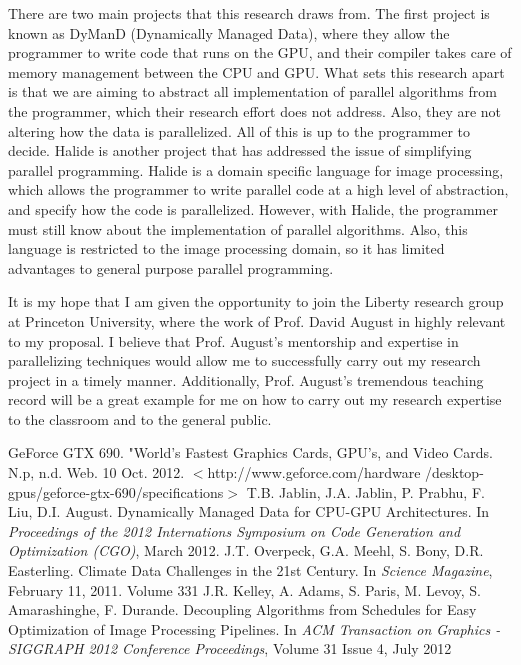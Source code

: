 \documentclass[a4paper,12pt]{article}
\begin{document}
There are two main projects that this research draws from. The first project is known as DyManD (Dynamically Managed Data)\cite{dymand}, where they allow the programmer to write code that runs on the GPU, and their compiler takes care of memory management between the CPU and GPU.  What sets this research apart is that we are aiming to abstract all implementation of parallel algorithms from the programmer, which their research effort does not address. Also, they are not altering how the data is parallelized.  All of this is up to the programmer to decide. Halide\cite{halide} is another project that has addressed the issue of simplifying parallel programming.  Halide is a domain specific language for image processing, which allows the programmer to write parallel code at a high level of abstraction, and specify how the code is parallelized.  However, with Halide, the programmer must still know about the implementation of parallel algorithms.  Also, this language is restricted to the image processing domain, so it has limited advantages to general purpose parallel programming.

It is my hope that I am given the opportunity to join the Liberty research group at Princeton University, where the work of Prof. David August in highly relevant to my proposal. I believe that Prof. August's mentorship and expertise in parallelizing techniques would allow me to successfully carry out my research project in a timely manner. Additionally, Prof. August's tremendous teaching record will be a great example for me on how to carry out my research expertise to the classroom and to the general public. 



\vspace{-2ex}
\begin{thebibliography}{9}
\vspace{-2ex}
 GeForce GTX 690. "World's Fastest Graphics Cards, GPU's, and Video Cards. N.p, n.d. Web. 10 Oct. 2012.
 $<$http://www.geforce.com/hardware /desktop-gpus/geforce-gtx-690/specifications$>$
\vspace{-2ex}
 T.B. Jablin, J.A. Jablin, P. Prabhu, F. Liu, D.I. August. Dynamically Managed Data for CPU-GPU Architectures. In \textit{Proceedings of the 2012 Internations Symposium on Code Generation and Optimization (CGO)}, March 2012.
\vspace{-2ex}
 J.T. Overpeck, G.A. Meehl, S. Bony, D.R. Easterling.  Climate Data Challenges in the 21st Century.  In \textit{Science Magazine}, February 11, 2011.  Volume 331
\vspace{-2ex}
 J.R. Kelley, A. Adams, S. Paris, M. Levoy, S. Amarashinghe, F. Durande.  Decoupling Algorithms from Schedules for Easy Optimization of Image Processing Pipelines.  In \textit{ACM Transaction on Graphics - SIGGRAPH 2012 Conference Proceedings}, Volume 31 Issue 4, July 2012
\end{thebibliography}
\end{document}
